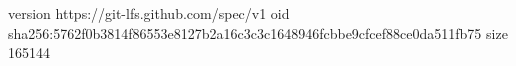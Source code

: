 version https://git-lfs.github.com/spec/v1
oid sha256:5762f0b3814f86553e8127b2a16c3c3c1648946fcbbe9cfcef88ce0da511fb75
size 165144
